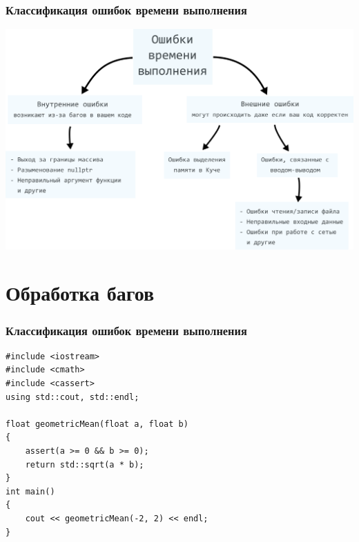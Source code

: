 \documentclass[10pt,pdf,hyperref={unicode}]{beamer}
\begin{document}
\begin{frame}[fragile]
\frametitle{Классификация ошибок времени выполнения} 
\begin{center}
\includegraphics[scale=0.6]{../images/error_types.png}
\end{center}
\end{frame}


\section{Обработка багов}

\begin{frame}[fragile]
\frametitle{Классификация ошибок времени выполнения} 
\begin{lstlisting}
#include <iostream>
#include <cmath>
#include <cassert>
using std::cout, std::endl;

float geometricMean(float a, float b)
{
    assert(a >= 0 && b >= 0);
    return std::sqrt(a * b);
}
int main()
{
    cout << geometricMean(-2, 2) << endl;
}
\end{lstlisting}
\end{frame}
\end{document}
